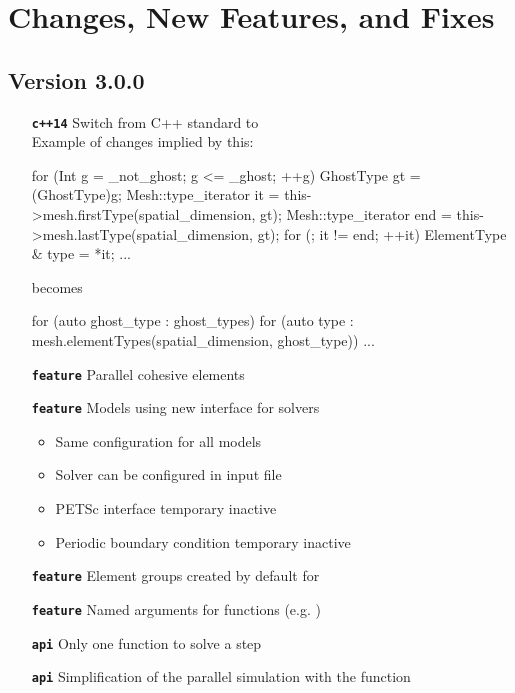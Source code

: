 \chapter*{Changes, New Features, and Fixes}

\section*{Version 3.0.0}

\begin{itemize}
\item[\textbf{\texttt{c++14}}] Switch from C++ standard  to \\
  Example of changes implied by this:
  \begin{cpp}
 for (Int g = _not_ghost; g <= _ghost; ++g) {
   GhostType gt = (GhostType)g;
   Mesh::type_iterator it = this->mesh.firstType(spatial_dimension, gt);
   Mesh::type_iterator end = this->mesh.lastType(spatial_dimension, gt);
   for (; it != end; ++it) {
     ElementType & type = *it;
       ...
   }
 }
\end{cpp}
becomes
  \begin{cpp}
 for (auto ghost_type : ghost_types) {
   for (auto type : mesh.elementTypes(spatial_dimension,
                                      ghost_type)) {
     ...
   }
 }
\end{cpp}
\item[\textbf{\texttt{feature}}] Parallel cohesive elements
\item[\textbf{\texttt{feature}}] Models using new interface for solvers
  \begin{itemize}
  \item Same configuration for all models
  \item Solver can be configured in input file
  \item PETSc interface temporary inactive
  \item Periodic boundary condition temporary inactive
  \end{itemize}
\item[\textbf{\texttt{feature}}] Element groups created by default for 
\item[\textbf{\texttt{feature}}] Named arguments for functions (e.g. )

\item[\textbf{\texttt{api}}] Only one function to solve a step 
\item[\textbf{\texttt{api}}] Simplification of the parallel simulation with the
   function

\end{itemize}
